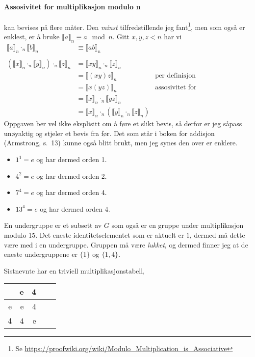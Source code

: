 \documentclass[a4paper,norsk,12pt]{article}
\begin{document}
\paragraph{Assosivitet for multiplikasjon modulo n} kan bevises på flere måter.
Den \textit{minst} tilfredstillende jeg fant\footnote{Se
\url{https://proofwiki.org/wiki/Modulo_Multiplication_is_Associative}},
men som også er enklest, er å
bruke $\llbracket a \rrbracket_n \equiv a \mod {n}$. Gitt $x,y,z < n$ har vi
\begin{align*}
  \llbracket a \rrbracket_n \cdot_n \llbracket b \rrbracket_n &\equiv
    \llbracket ab \rrbracket_n \\
    \\
    \left(\llbracket x \rrbracket_n \cdot_n \llbracket y \rrbracket_n\right)
    \cdot_n \llbracket z \rrbracket_n &= 
      \llbracket xy \rrbracket_n \cdot_n \llbracket z \rrbracket_n \\
      &= \llbracket (xy)z \rrbracket_n & \text{per definisjon} \\
      &= \llbracket x(yz) \rrbracket_n & \text{assosivitet for
    heltallsmultiplikasjon} \\
      &= \llbracket x \rrbracket_n \cdot_n \llbracket yz \rrbracket_n \\
      &= \llbracket x \rrbracket_n \cdot_n \left( \llbracket y \rrbracket_n
    \cdot_n \llbracket z \rrbracket_n \right)
\end{align*}
Oppgaven ber vel ikke eksplisitt om å føre et slikt bevis, så derfor er jeg
såpass unøyaktig og stjeler et bevis fra før. Det som står i boken for addisjon
(Armstrong, s.~13) kunne også blitt brukt, men jeg synes den over er enklere.

\begin{itemize}
  \item $1^1 = e$ og har dermed orden 1.
  \item $4^2 = e$ og har dermed orden 2.
  \item $7^4 = e$ og har dermed orden 4.
  \item $13^4 = e$ og har dermed orden 4.
\end{itemize}

En undergruppe er et subsett av $G$ som også er en gruppe under multiplikasjon
modulo 15. Det eneste identitetselementet som er aktuelt er $1$, dermed må
dette være med i en undergruppe. Gruppen må være \textit{lukket}, og dermed
finner jeg at de eneste undergruppene er $\{1\}$ og $\{1,4\}$.

Sistnevnte har en triviell multiplikasjonstabell,
\begin{table}[htp]
  \centering
  \begin{tabular}{r|rrrr}
       &  e &  4 \\ \hline
     e &  e &  4 \\
     4 &  4 &  e \\
  \end{tabular}
\end{table}


\end{document}
